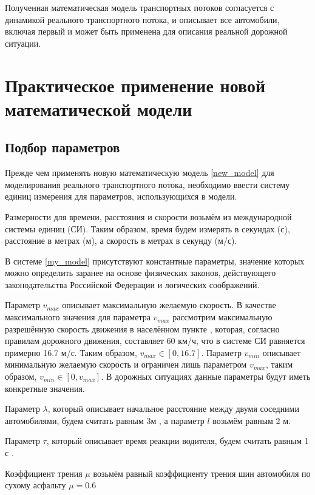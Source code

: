 \documentclass[12pt, a4paper]{extarticle}
\numberwithin{equation}{section}
\numberwithin{figure}{section}
\begin{document}
Полученная математическая модель транспортных потоков согласуется с динамикой реального транспортного потока, и описывает все автомобили, включая первый и может быть применена для описания реальной дорожной ситуации.

\section{Практическое применение новой математической модели} 

\subsection{Подбор параметров} 

Прежде чем применять новую математическую модель \eqref{new_model} для моделирования реального транспортного потока, необходимо ввести систему единиц измерения для параметров, использующихся в модели.

Размерности для времени, расстояния и скорости возьмём из международной системы единиц (СИ). Таким образом, время будем измерять в секундах (с), расстояние в метрах (м), а скорость в метрах в секунду (м/с).

В системе \eqref{my_model} присутствуют константные параметры, значение которых можно определить заранее на основе физических законов, действующего законодательства Российской Федерации и логических соображений.

Параметр $v_{max}$ описывает максимальную желаемую скорость. В качестве максимального значения для параметра $v_{max}$ рассмотрим максимальную разрешённую скорость движения в населённом пункте \cite{PDD}, которая, согласно правилам дорожного движения, составляет 60 км/ч, что в системе СИ равняется примерно 16.7 м/с. Таким образом, $v_{max} \in [0,16.7]$. Параметр $v_{min}$ описывает минимальную желаемую скорость и ограничен лишь параметром $v_{max}$, таким образом, $v_{min} \in [0,v_{max}]$. В дорожных ситуациях данные параметры будут иметь конкретные значения.

Параметр $\lambda$, который описывает начальное расстояние между двумя соседними автомобилями, будем считать равным 3м \cite{PDD}, а параметр $l$ возьмём равным 2 м.

Параметр $\tau$, который описывает время реакции водителя, будем считать равным 1 с \cite{PDD}.

Коэффициент трения $\mu$ возьмём равный коэффициенту трения шин автомобиля по сухому асфальту $\mu=0.6$ \cite{Physics}
\end{document}
